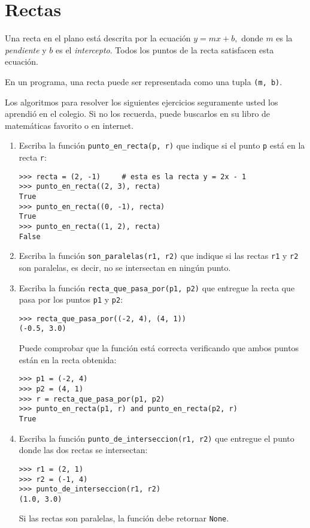\section{Rectas}

Una recta en el plano está descrita por la ecuación \(y = mx + b,\)
donde \(m\) es la \emph{pendiente} y \(b\) es el \emph{intercepto}. Todos
los puntos de la recta satisfacen esta ecuación.

En un programa, una recta puede ser representada como una tupla
\lstinline!(m, b)!.

Los algoritmos para resolver los siguientes ejercicios seguramente usted
los aprendió en el colegio. Si no los recuerda, puede buscarlos en su
libro de matemáticas favorito o en internet.

\begin{enumerate}

  \item
    Escriba la función \lstinline!punto_en_recta(p, r)! que indique si el
    punto \lstinline!p! está en la recta \lstinline!r!:
\begin{lstlisting}
>>> recta = (2, -1)     # esta es la recta y = 2x - 1
>>> punto_en_recta((2, 3), recta)
True
>>> punto_en_recta((0, -1), recta)
True
>>> punto_en_recta((1, 2), recta)
False
\end{lstlisting}

  \item
    Escriba la función \lstinline!son_paralelas(r1, r2)! que indique si
    las rectas \lstinline!r1! y \lstinline!r2! son paralelas, es decir, no
    se intersectan en ningún punto.

  \item
    Escriba la función \lstinline!recta_que_pasa_por(p1, p2)! que entregue
    la recta que pasa por los puntos \lstinline!p1! y \lstinline!p2!:
\begin{lstlisting}
>>> recta_que_pasa_por((-2, 4), (4, 1))
(-0.5, 3.0)
\end{lstlisting}

    Puede comprobar que la función está correcta verificando que ambos
    puntos están en la recta obtenida:
\begin{lstlisting}
>>> p1 = (-2, 4)
>>> p2 = (4, 1)
>>> r = recta_que_pasa_por(p1, p2)
>>> punto_en_recta(p1, r) and punto_en_recta(p2, r)
True
\end{lstlisting}

  \item
    Escriba la función \lstinline!punto_de_interseccion(r1, r2)! que
    entregue el punto donde las dos rectas se intersectan:
\begin{lstlisting}
>>> r1 = (2, 1)
>>> r2 = (-1, 4)
>>> punto_de_interseccion(r1, r2)
(1.0, 3.0)
\end{lstlisting}

    Si las rectas son paralelas, la función debe retornar
    \lstinline!None!.
\end{enumerate}
